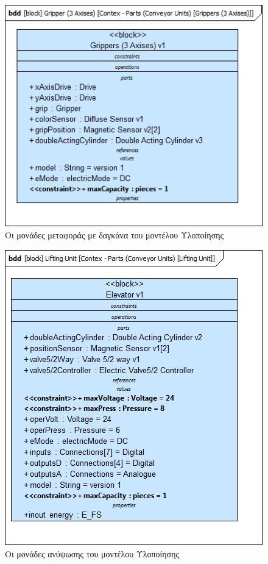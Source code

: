 \documentclass[a4paper,12pt,twoside]{report}
\begin{document}
{\begin{appendices}
				\begin{figure}[hp]
					\centering
					\includegraphics[scale=0.50]{DesignModel_Contex-Parts(ConveyorUnits)[Grippers(3Axises)].png}
					\caption{Οι μονάδες μεταφοράς με δαγκάνα του μοντέλου Υλοποίησης}
					\label{φωτ:Οι μονάδες μεταφοράς με δαγκάνα του μοντέλου Υλοποίησης}
				\end{figure}
				
				\begin{figure}[hp]
					\centering
					\includegraphics[scale=0.50]{DesignModel_Contex-Parts(ConveyorUnits)[LiftingUnit].png}
					\caption{Οι μονάδες ανύψωσης του μοντέλου Υλοποίησης}
					\label{φωτ:Οι μονάδες ανύψωσης του μοντέλου Υλοποίησης}
				\end{figure}
				

\end{appendices}}
\end{document}
